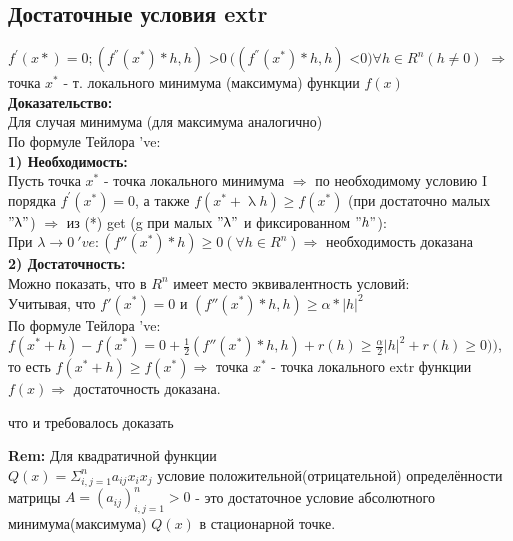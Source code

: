 \subsection*{Достаточные условия extr} $f^{'}(x*)=0; (f^{''}(x^*)*h, h)$ \textgreater $0 \ ((f^{''}(x^*)*h, h)$ \textless $0) \forall h \in R^n (h \neq 0)$ $\Rightarrow $ точка $x^*$ - т. локального минимума (максимума) функции $f(x)$\\
\textbf{Доказательство:} \\
Для случая минимума (для максимума аналогично) \\
По формуле Тейлора 've:
 \\
\textbf{1) Необходимость:} \\
Пусть точка $x^*$ - точка локального минимума $\Rightarrow$ по необходимому условию I порядка $f^{'}(x^*)=0$, а также $f(x^* + \uplambda h) \geq f(x^*)$ (при достаточно малых $"\uplambda"$) $\Rightarrow$ из (*) get (g при малых $"\uplambda"$ и фиксированном $"h"$):
\\
При $\lambda \rightarrow 0 \ 've: (f''(x^*)*h)\geq 0 (\forall h \in R^n) \Rightarrow $ необходимость доказана \\
\textbf{2) Достаточность:}\\
Можно показать, что в $R^n$ имеет место эквивалентность условий:
\\
Учитывая, что $f'(x^*)=0$ и $(f''(x^*)*h,h)\geq \alpha * |h|^2$\\
По формуле Тейлора 've:\\
$f(x^*+h)-f(x^*)=0+\frac{1}{2}(f''(x^*)*h,h)+r(h)\geq \frac{\alpha}{2}|h|^2+r(h) \geq 0))$, то есть $f(x^*+h) \geq f(x^*) \Rightarrow$ точка $x^*$ - точка локального extr функции $f(x) \Rightarrow$ достаточность доказана.
\begin{center}
что и требовалось доказать
\end{center}
\textbf{Rem:} 
Для квадратичной функции\\
$Q(x)=\Sigma^n_{i,j=1} a_{ij}x_i x_j$ условие положительной(отрицательной) определённости матрицы $A=(a_{ij})^n_{i,j=1}>0$ - это достаточное условие абсолютного минимума(максимума) $Q(x)$ в стационарной точке.
\newpage

